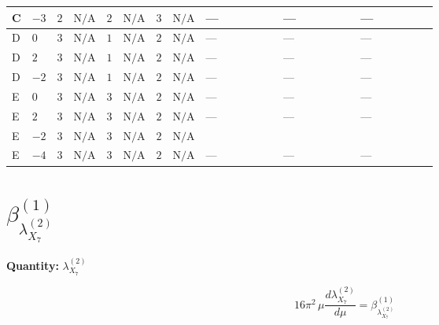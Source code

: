 \documentclass[8pt]{article}
\begin{document}
\begin{landscape}
\begin{longtable}{@{}llcccccc >{\raggedright\arraybackslash}p{0.21\linewidth} >{\raggedright\arraybackslash}p{0.21\linewidth} >{\raggedright\arraybackslash}p{0.21\linewidth}@{}}
\midrule
C & $-3$ & $2$ & $\text{N/A}$ & $2$ & $\text{N/A}$ & $3$ & $\text{N/A}$ & --- & --- & --- \\
\midrule
D & $0$ & $3$ & $\text{N/A}$ & $1$ & $\text{N/A}$ & $2$ & $\text{N/A}$ & --- & --- & --- \\
\midrule
D & $2$ & $3$ & $\text{N/A}$ & $1$ & $\text{N/A}$ & $2$ & $\text{N/A}$ & --- & --- & --- \\
\midrule
D & $-2$ & $3$ & $\text{N/A}$ & $1$ & $\text{N/A}$ & $2$ & $\text{N/A}$ & --- & --- & --- \\
\midrule
E & $0$ & $3$ & $\text{N/A}$ & $3$ & $\text{N/A}$ & $2$ & $\text{N/A}$ & --- & --- & --- \\
\midrule
E & $2$ & $3$ & $\text{N/A}$ & $3$ & $\text{N/A}$ & $2$ & $\text{N/A}$ & --- & --- & --- \\
\midrule
E & $-2$ & $3$ & $\text{N/A}$ & $3$ & $\text{N/A}$ & $2$ & $\text{N/A}$ & \scriptsize\adjustbox{max width=\linewidth}{$\begin{gathered} +{\lambda_{S_1}^{(1)}} (8 {\lambda_{X_{7}}^{(1)}}+2 {\lambda_{X_{7}}^{(2)}})\end{gathered}$} & \scriptsize\adjustbox{max width=\linewidth}{$\begin{gathered} +{\lambda_{S_1}^{(A)}} (4 {\lambda_{X_{7}}^{(1)}}+2 {\lambda_{X_{7}}^{(2)}})\end{gathered}$} & \scriptsize\adjustbox{max width=\linewidth}{$\begin{gathered} +{\lambda_{S_2}^{(A)}} (-4 {\lambda_{X_{7}}^{(1)}}-2 {\lambda_{X_{7}}^{(2)}})\end{gathered}$} \\
\midrule
E & $-4$ & $3$ & $\text{N/A}$ & $3$ & $\text{N/A}$ & $2$ & $\text{N/A}$ & --- & --- & --- \\
\midrule
\bottomrule
\end{longtable}
\clearpage
\section*{$\beta_{{\lambda_{X_{7}}^{(2)}}}^{(1)}$}
\noindent\textbf{Quantity: }${\lambda_{X_{7}}^{(2)}}$\par\smallskip
\[16\pi^2\,\mu\frac{d {\lambda_{X_{7}}^{(2)}}}{d\mu}=\beta_{{\lambda_{X_{7}}^{(2)}}}^{(1)}\]

\end{landscape}
\end{document}
